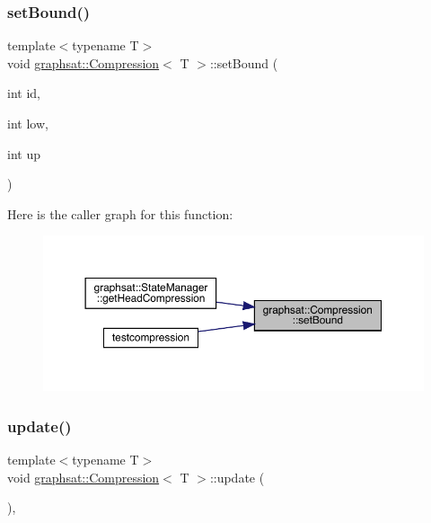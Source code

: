 \subsubsection{\texorpdfstring{setBound()}{setBound()}}
{\footnotesize\ttfamily template$<$typename T$>$ \\
void \mbox{\hyperlink{classgraphsat_1_1_compression}{graphsat\+::\+Compression}}$<$ T $>$\+::set\+Bound (\begin{DoxyParamCaption}\item[{int}]{id,  }\item[{int}]{low,  }\item[{int}]{up }\end{DoxyParamCaption})\hspace{0.3cm}{\ttfamily [inline]}}

Here is the caller graph for this function\+:
\nopagebreak
\begin{figure}[H]
\begin{center}
\leavevmode
\includegraphics[width=350pt]{classgraphsat_1_1_compression_aca0cf58115662df90a0ba2d7b8fc699b_icgraph}
\end{center}
\end{figure}
\mbox{\label{classgraphsat_1_1_compression_aaf2178a46a2874f7c91b59587f199ecf}} 
\subsubsection{\texorpdfstring{update()}{update()}}
{\footnotesize\ttfamily template$<$typename T$>$ \\
void \mbox{\hyperlink{classgraphsat_1_1_compression}{graphsat\+::\+Compression}}$<$ T $>$\+::update (\begin{DoxyParamCaption}{ }\end{DoxyParamCaption})\hspace{0.3cm}{\ttfamily [inline]}, {\ttfamily [private]}}

